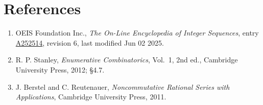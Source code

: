 \documentclass[11pt]{article}
\theoremstyle{definition}
\begin{document}
\section{References}

\begin{enumerate}

\item OEIS Foundation Inc., \emph{The On-Line Encyclopedia of Integer Sequences}, entry \href{https://oeis.org/A252514}{A252514}, revision 6, last modified Jun 02 2025.

\item R. P. Stanley, \emph{Enumerative Combinatorics}, Vol.~1, 2nd ed., Cambridge University Press, 2012; \S4.7.

\item J. Berstel and C. Reutenauer, \emph{Noncommutative Rational Series with Applications}, Cambridge University Press, 2011.

\end{enumerate}
\end{document}
